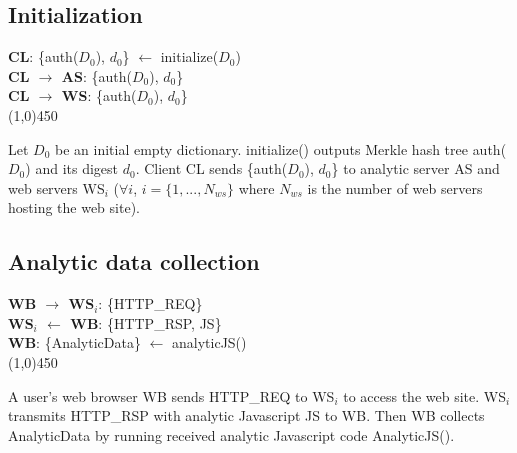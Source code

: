 \subsection{Initialization}

\begin{framed}
\noindent
\textbf{CL}: \textsf{ \{auth($D_0$), $d_0$\} $\leftarrow$ initialize($D_0$)}	\\
\textbf{CL $\rightarrow$ AS}: \textsf{ \{auth($D_0$), $d_0$\} } 	\\
\textbf{CL $\rightarrow$ WS}: \textsf{ \{auth($D_0$), $d_0$\} } 	\\
\line(1,0){450}

\noindent
Let $D_0$ be an initial empty dictionary.  \textsf{initialize()} outputs Merkle hash tree \textsf{auth($D_0$)} and its digest \textsf{$d_0$}.
Client \textsf{CL} sends \textsf{\{auth($D_0$), $d_0$\}} to analytic server \textsf{AS} and web servers \textsf{WS$_i$} ($\forall i$, $i = \{1,...,N_{ws}\}$ where $N_{ws}$ is the number of web servers hosting the web site). 
\end{framed}


\subsection{Analytic data collection}
\begin{framed}
\noindent
\textbf{WB $\rightarrow$ WS$_i$}: \textsf{\{HTTP\_REQ\}}	\\
\textbf{WS$_i$ $\leftarrow$ WB}: \textsf{\{HTTP\_RSP, JS\}}	\\
\textbf{WB}: \textsf{\{AnalyticData\} $\leftarrow$ analyticJS()}	\\
\line(1,0){450}

\noindent
A user's web browser \textsf{WB} sends \textsf{HTTP\_REQ} to \textsf{WS$_i$} to access the web site.
\textsf{WS$_i$} transmits \textsf{HTTP\_RSP} with analytic Javascript \textsf{JS} to \textsf{WB}.
Then \textsf{WB} collects \textsf{AnalyticData} by running received analytic Javascript code \textsf{AnalyticJS()}.
\end{framed}


